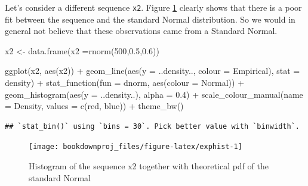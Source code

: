 \documentclass[
]{book}
\newenvironment{Shaded}{\begin{snugshade}}{\end{snugshade}}
\newcommand{\AttributeTok}[1]{\textcolor[rgb]{0.77,0.63,0.00}{#1}}
\newcommand{\DecValTok}[1]{\textcolor[rgb]{0.00,0.00,0.81}{#1}}
\newcommand{\FloatTok}[1]{\textcolor[rgb]{0.00,0.00,0.81}{#1}}
\newcommand{\FunctionTok}[1]{\textcolor[rgb]{0.00,0.00,0.00}{#1}}
\newcommand{\NormalTok}[1]{#1}
\newcommand{\OtherTok}[1]{\textcolor[rgb]{0.56,0.35,0.01}{#1}}
\newcommand{\SpecialCharTok}[1]{\textcolor[rgb]{0.00,0.00,0.00}{#1}}
\newcommand{\StringTok}[1]{\textcolor[rgb]{0.31,0.60,0.02}{#1}}
\theoremstyle{definition}
\theoremstyle{definition}
\theoremstyle{definition}
\theoremstyle{definition}
\theoremstyle{remark}
\begin{document}
Let's consider a different sequence \texttt{x2}. Figure \ref{fig:exphist} clearly shows that there is a poor fit between the sequence and the standard Normal distribution. So we would in general not believe that these observations came from a Standard Normal.

\begin{Shaded}
\begin{Highlighting}[]
\NormalTok{x2 }\OtherTok{\textless{}{-}} \FunctionTok{data.frame}\NormalTok{(}\AttributeTok{x2 =}\FunctionTok{rnorm}\NormalTok{(}\DecValTok{500}\NormalTok{,}\FloatTok{0.5}\NormalTok{,}\FloatTok{0.6}\NormalTok{))}
\end{Highlighting}
\end{Shaded}

\begin{Shaded}
\begin{Highlighting}[]
\FunctionTok{ggplot}\NormalTok{(x2, }\FunctionTok{aes}\NormalTok{(x2)) }\SpecialCharTok{+}
   \FunctionTok{geom\_line}\NormalTok{(}\FunctionTok{aes}\NormalTok{(}\AttributeTok{y =}\NormalTok{ ..density.., }\AttributeTok{colour =} \StringTok{\textquotesingle{}Empirical\textquotesingle{}}\NormalTok{), }\AttributeTok{stat =} \StringTok{\textquotesingle{}density\textquotesingle{}}\NormalTok{) }\SpecialCharTok{+}
   \FunctionTok{stat\_function}\NormalTok{(}\AttributeTok{fun =}\NormalTok{ dnorm, }\FunctionTok{aes}\NormalTok{(}\AttributeTok{colour =} \StringTok{\textquotesingle{}Normal\textquotesingle{}}\NormalTok{)) }\SpecialCharTok{+}      
   \FunctionTok{geom\_histogram}\NormalTok{(}\FunctionTok{aes}\NormalTok{(}\AttributeTok{y =}\NormalTok{ ..density..), }\AttributeTok{alpha =} \FloatTok{0.4}\NormalTok{) }\SpecialCharTok{+}      
   \FunctionTok{scale\_colour\_manual}\NormalTok{(}\AttributeTok{name =} \StringTok{\textquotesingle{}Density\textquotesingle{}}\NormalTok{, }\AttributeTok{values =} \FunctionTok{c}\NormalTok{(}\StringTok{\textquotesingle{}red\textquotesingle{}}\NormalTok{, }\StringTok{\textquotesingle{}blue\textquotesingle{}}\NormalTok{)) }\SpecialCharTok{+}
   \FunctionTok{theme\_bw}\NormalTok{()}
\end{Highlighting}
\end{Shaded}

\begin{verbatim}
## `stat_bin()` using `bins = 30`. Pick better value with `binwidth`.
\end{verbatim}

\begin{figure}

{\centering \texttt{[image: bookdownproj\_files/figure-latex/exphist-1]} 

}

\caption{Histogram of the sequence x2 together with theoretical pdf of the standard Normal}\label{fig:exphist}
\end{figure}
\end{document}
